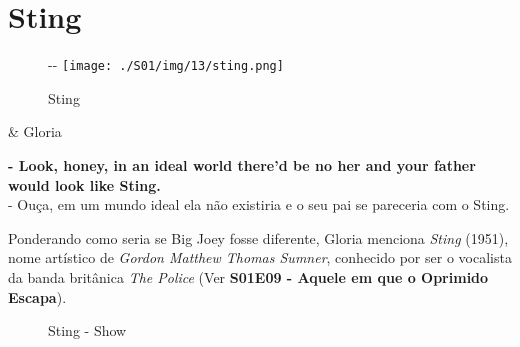 \hypertarget{sting}{%
\section{Sting}\label{sting}}

\begin{figure}[!ht]
  \begin{adjustwidth}{-\oddsidemargin-1in}{-\rightmargin}
    \centering
    \texttt{[image: ./S01/img/13/sting.png]}
    \caption{Sting\label{fig:sting}}
  \end{adjustwidth}
\end{figure}

\begin{tcolorbox}[enhanced,center upper,
    drop fuzzy shadow southeast, boxrule=0.3pt,
    lower separated=false,
    colframe=black!30!dialogoBorder,colback=white]
\begin{minipage}[c]{0.16\linewidth}
   & \centering \scriptsize{Gloria}
\end{minipage}
\hfill
\begin{minipage}[c]{0.8\linewidth}
  \textbf{- Look, honey, in an ideal world there'd be no her and your father would look like Sting.}\\
  - Ouça, em um mundo ideal ela não existiria e o seu pai se pareceria com o Sting.
\end{minipage}
\end{tcolorbox}

Ponderando como seria se Big Joey fosse diferente, Gloria menciona
\emph{Sting} (1951), nome artístico de \emph{Gordon Matthew Thomas
Sumner}, conhecido por ser o vocalista da banda britânica \emph{The
Police} (Ver
\textbf{\textcolor{primarycolor}{S01E09 - Aquele em que o Oprimido Escapa}}).

\begin{figure}
  \centering
    \caption{Sting - Show\label{fig:sting-show}}
\end{figure}


